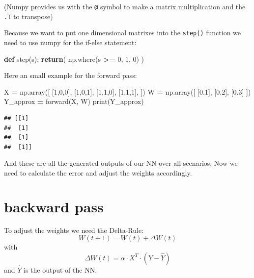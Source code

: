 \documentclass[
]{book}
\newenvironment{Shaded}{\begin{snugshade}}{\end{snugshade}}
\newcommand{\BuiltInTok}[1]{#1}
\newcommand{\ControlFlowTok}[1]{\textcolor[rgb]{0.13,0.29,0.53}{\textbf{#1}}}
\newcommand{\DecValTok}[1]{\textcolor[rgb]{0.00,0.00,0.81}{#1}}
\newcommand{\FloatTok}[1]{\textcolor[rgb]{0.00,0.00,0.81}{#1}}
\newcommand{\KeywordTok}[1]{\textcolor[rgb]{0.13,0.29,0.53}{\textbf{#1}}}
\newcommand{\NormalTok}[1]{#1}
\newcommand{\OperatorTok}[1]{\textcolor[rgb]{0.81,0.36,0.00}{\textbf{#1}}}
\begin{document}
(Numpy provides us with the \texttt{@} symbol to make a matrix multiplication and the \texttt{.T} to transpose)

Because we want to put one dimensional matrixes into the \texttt{step()} function we need to use numpy for the if-else statement:

\begin{Shaded}
\begin{Highlighting}[]
\KeywordTok{def}\NormalTok{ step(s):}
  \ControlFlowTok{return}\NormalTok{( np.where(s }\OperatorTok{\textgreater{}=} \DecValTok{0}\NormalTok{, }\DecValTok{1}\NormalTok{, }\DecValTok{0}\NormalTok{) )}
\end{Highlighting}
\end{Shaded}

Here an small example for the forward pass:

\begin{Shaded}
\begin{Highlighting}[]
\NormalTok{X }\OperatorTok{=}\NormalTok{ np.array([}
\NormalTok{  [}\DecValTok{1}\NormalTok{,}\DecValTok{0}\NormalTok{,}\DecValTok{0}\NormalTok{],}
\NormalTok{  [}\DecValTok{1}\NormalTok{,}\DecValTok{0}\NormalTok{,}\DecValTok{1}\NormalTok{],}
\NormalTok{  [}\DecValTok{1}\NormalTok{,}\DecValTok{1}\NormalTok{,}\DecValTok{0}\NormalTok{],}
\NormalTok{  [}\DecValTok{1}\NormalTok{,}\DecValTok{1}\NormalTok{,}\DecValTok{1}\NormalTok{],}
\NormalTok{])}
\NormalTok{W }\OperatorTok{=}\NormalTok{ np.array([}
\NormalTok{  [}\FloatTok{0.1}\NormalTok{], }
\NormalTok{  [}\FloatTok{0.2}\NormalTok{], }
\NormalTok{  [}\FloatTok{0.3}\NormalTok{]}
\NormalTok{])}
\NormalTok{Y\_approx }\OperatorTok{=}\NormalTok{ forward(X, W)}
\BuiltInTok{print}\NormalTok{(Y\_approx)}
\end{Highlighting}
\end{Shaded}

\begin{verbatim}
## [[1]
##  [1]
##  [1]
##  [1]]
\end{verbatim}

And these are all the generated outputs of our NN over all scenarios. Now we need to calculate the error and adjust the weights accordingly.

\hypertarget{backward-pass}{%
\section{backward pass}\label{backward-pass}}

To adjust the weights we need the Delta-Rule:
\[
  W(t+1) = W(t) + \Delta W(t)
\]
with
\[
  \Delta W(t) = \alpha \cdot X^{T} \cdot (Y - \hat{Y})
\]
and \(\hat{Y}\) is the output of the NN.
\end{document}
